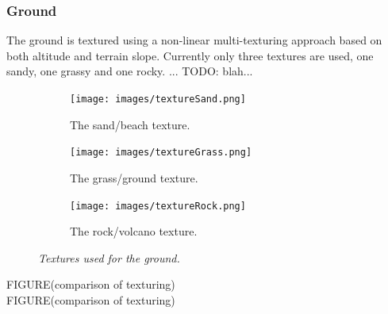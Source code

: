 \subsubsection{Ground}
The ground is textured using a non-linear multi-texturing approach based on both altitude and terrain slope. Currently only three textures are used, one sandy, one grassy and one rocky. ... TODO: blah...\\
\begin{figure}[H]
\begin{subfigure}{.33\textwidth}
  \centering
  \texttt{[image: images/textureSand.png]}
  \caption{The sand/beach texture.}
  \label{fig:textureSand}
\end{subfigure}%
\begin{subfigure}{.33\textwidth}
  \centering
  \texttt{[image: images/textureGrass.png]}
  \caption{The grass/ground texture.}
  \label{fig:textureGrass}
\end{subfigure}
\begin{subfigure}{.33\textwidth}
  \centering
  \texttt{[image: images/textureRock.png]}
  \caption{The rock/volcano texture.}
  \label{fig:textureRock}
\end{subfigure}
\caption[Ground textures]{\textit{Textures used for the ground.}}
\label{fig:textures}
\end{figure}
FIGURE(comparison of texturing)
\\
FIGURE(comparison of texturing)
